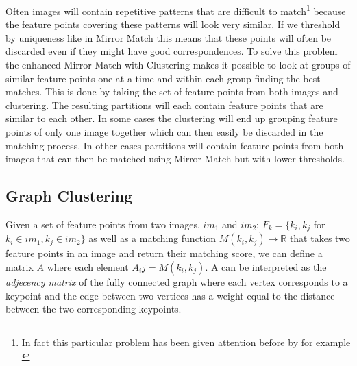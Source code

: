 \documentclass{article}
\begin{document}
Often images will contain repetitive patterns that are difficult to 
match\footnote{In fact this particular problem has been given attention 
before by for example \cite{fan2011towards}} because the feature points 
covering these patterns will look very similar. If we threshold by 
uniqueness like in Mirror Match this means that these points will often 
be discarded even if they might have good correspondences. To solve this 
problem the enhanced Mirror Match with Clustering makes it possible to 
look at groups of similar feature points one at a time and within each 
group finding the best matches. This is done by taking the set of 
feature points from both images and clustering. The resulting partitions 
will each contain feature points that are similar to each other. In some 
cases the clustering will end up grouping feature points of only one 
image together which can then easily be discarded in the matching 
process. In other cases partitions will contain feature points from both 
images that can then be matched using Mirror Match but with lower 
thresholds.




\subsection{Graph Clustering}

Given a set of feature points from two images, $im_1$ and $im_2$: $F_k = 
\{k_i, k_j$ for $k_i \in im_1, k_j \in im_2\}$ as well as a matching 
function $M(k_i, k_j) \rightarrow \mathbb{R}$ that takes two feature 
points in an image and return their matching score, we can define a 
matrix $A$ where each element $A_ij = M(k_i, k_j)$. A can be interpreted 
as the \emph{adjecency matrix} of the fully connected graph where each 
vertex corresponds to a keypoint and the edge between two vertices has a 
weight equal to the distance between the two corresponding keypoints.
\end{document}
